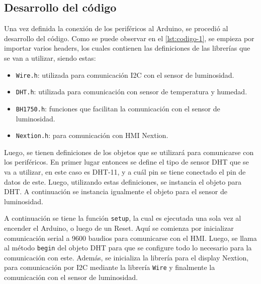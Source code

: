 \subsection{Desarrollo del código}

Una vez definida la conexión de los periféricos al Arduino, se procedió
al desarrollo del código. Como se puede observar en el \autoref{lst:codigo-1},
se empieza por importar varios headers, los cuales contienen las definiciones
de las librerías que se van a utilizar, siendo estas:
\begin{itemize}
    \item \texttt{Wire.h}: utilizada para comunicación I2C con el sensor de luminosidad.
    \item \texttt{DHT.h}: utilizada para comunicación con sensor de temperatura y humedad.
    \item \texttt{BH1750.h}: funciones que facilitan la comunicación con el sensor de luminosidad.
    \item \texttt{Nextion.h}: para comunicación con HMI Nextion.
\end{itemize}

Luego, se tienen definiciones de los objetos que se utilizará para comunicarse
con los periféricos. En primer lugar entonces se define el tipo de sensor DHT
que se va a utilizar, en este caso es DHT-11, y a cuál pin se tiene conectado
el pin de datos de este. Luego, utilizando estas definiciones, se instancia el
objeto para DHT. A continuación se instancia igualmente el objeto para el sensor
de luminosidad.

A continuación se tiene la función \texttt{setup}, la cual es ejecutada una sola
vez al encender el Arduino, o luego de un Reset. Aquí se comienza por inicializar
comunicación serial a 9600 baudios para comunicarse con el HMI. Luego, se llama
al método \texttt{begin} del objeto DHT para que se configure todo lo necesario
para la comunicación con este. Además, se inicializa la librería para el display
Nextion, para comunicación por I2C mediante la librería \texttt{Wire} y finalmente
la comunicación con el sensor de luminosidad.

